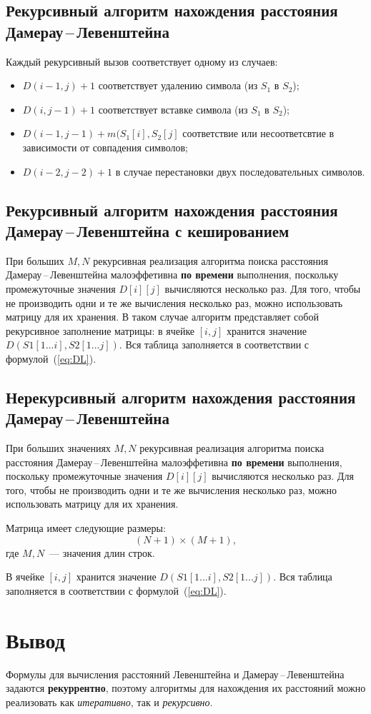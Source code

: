 \subsection{Рекурсивный алгоритм нахождения расстояния Дамерау\,--\,Левенштейна}

Каждый рекурсивный вызов соответствует одному из случаев:
\begin{itemize}
    \item $D(i - 1, j) + 1$ соответствует удалению символа (из $S_{1}$ в $S_{2}$);
    \item $D(i, j - 1) + 1$ соответствует вставке символа (из $S_{1}$ в $S_{2}$);
    \item $D(i - 1, j - 1) + m(S_{1}[i], S_{2}[j]$ соответствие или несоответсвтие в зависимости от совпадения символов;
    \item $D(i - 2, j - 2) + 1$ в случае перестановки двух последовательных символов.
\end{itemize}

\subsection{Рекурсивный алгоритм нахождения расстояния Дамерау\,--\,Левенштейна с кешированием}

При больших $M, N$ рекурсивная реализация алгоритма поиска расстояния Дамерау\,--\,Левенштейна малоэффетивна \textbf{по времени} выполнения, поскольку промежуточные значения $D[i][j]$ вычисляются несколько раз. 
Для того, чтобы не производить одни и те же вычисления несколько раз, можно использовать матрицу для их хранения.
В таком случае алгоритм представляет собой рекурсивное заполнение матрицы: в ячейке $[i, j]$ хранится значение $D(S1[1...i], S2[1...j])$. Вся таблица заполняется в соответствии с формулой~(\ref{eq:DL}). 

\subsection{Нерекурсивный алгоритм нахождения расстояния Дамерау\,--\,Левенштейна}

При больших значениях $M, N$ рекурсивная реализация алгоритма поиска расстояния Дамерау\,--\,Левенштейна малоэффетивна \textbf{по времени} выполнения, поскольку промежуточные значения $D[i][j]$ вычисляются несколько раз. Для того, чтобы не производить одни и те же вычисления несколько раз, можно использовать матрицу для их хранения.

Матрица имеет следующие размеры:
\begin{equation}
	\label{eq:lev-m-size}
	(N + 1) \times (M + 1),
\end{equation}
где $M, N$~--- значения длин строк.

В ячейке $[i, j]$ хранится значение $D(S1[1...i], S2[1...j])$. Вся таблица заполняется в соответствии с формулой~(\ref{eq:DL}). 

\section*{Вывод}
Формулы для вычисления расстояний Левенштейна и Дамерау\,--\,Левенштейна задаются \textbf{рекуррентно}, поэтому алгоритмы для нахождения их расстояний можно реализовать как \textit{итеративно}, так и \textit{рекурсивно}.
